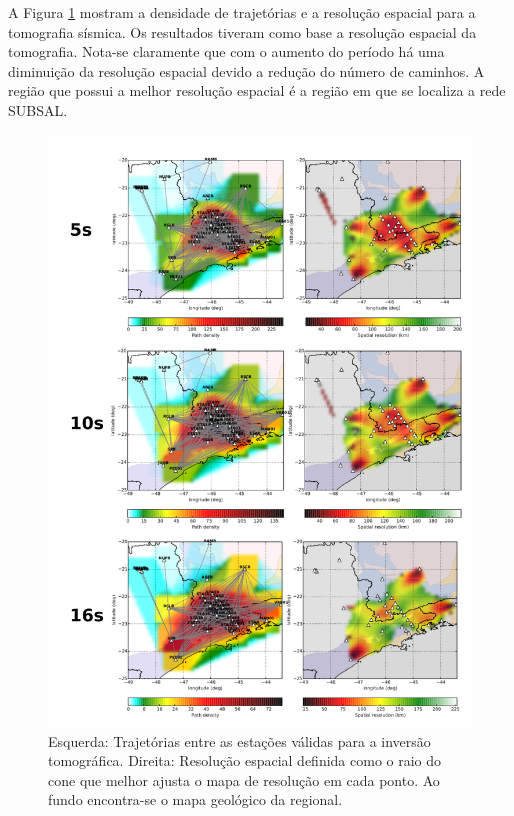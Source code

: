 A Figura \ref{resolution} mostram a densidade de trajetórias e a resolução espacial para a tomografia sísmica. Os resultados tiveram como base a resolução espacial da tomografia. Nota-se claramente que com o aumento do período há uma diminuição da resolução espacial devido a redução do número de caminhos. A região que possui a melhor resolução espacial é a região em que se localiza a rede SUBSAL.

\begin{figure}[!ht]
\centering
\includegraphics[scale=0.20]{Figs/resolution_maps.png}
\caption[Mosaico contendo trajetórias entre as estações e a resolução espacial.]{Esquerda: Trajetórias entre as estações válidas para a inversão tomográfica. Direita: Resolução espacial definida como o raio do cone que melhor ajusta o mapa de resolução em cada ponto. Ao fundo encontra-se o mapa geológico da regional.}
\label{resolution}
\end{figure}


\pagebreak
